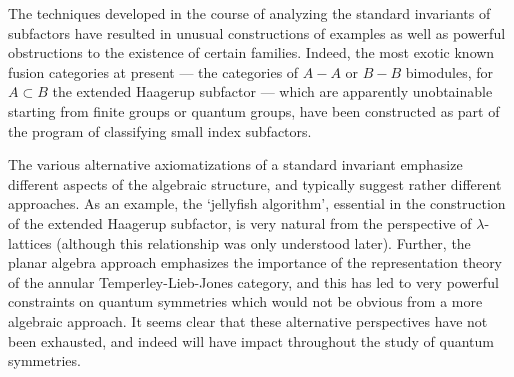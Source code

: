 \documentclass[12pt]{article}
\begin{document}
The techniques developed in the course of analyzing the standard invariants of
subfactors have resulted in unusual constructions of examples as well as
powerful obstructions to the existence of certain families. Indeed, the most
exotic known fusion categories at present --- the categories of $A-A$ or $B-B$
bimodules, for $A \subset B$ the extended Haagerup subfactor --- which are apparently
unobtainable starting from finite groups or quantum groups, have been
constructed as part of the program of classifying small index subfactors.

The various alternative axiomatizations of a standard invariant emphasize
different aspects of the algebraic structure, and typically suggest rather
different approaches. As an example, the `jellyfish algorithm', essential in
the construction of the extended Haagerup subfactor, is very natural from the
perspective of $\lambda$-lattices (although this relationship was only
understood later). Further, the planar algebra approach emphasizes the
importance of the representation theory of the annular Temperley-Lieb-Jones
category, and this has led to very powerful constraints on quantum symmetries
which would not be obvious from a more algebraic approach. It seems clear that
these alternative perspectives have not been exhausted, and indeed will have
impact throughout the study of quantum symmetries.
\end{document}
